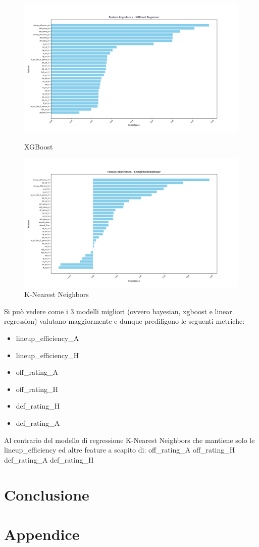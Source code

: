 \documentclass[a4paper]{article}
\numberwithin{equation}{section}
\begin{document}
\begin{figure}[H]
    \centering
    \begin{minipage}[b]{0.45\linewidth}
        \centering
        \includegraphics[width=\linewidth]{img/xgboost.png}
        \caption{XGBoost}
        \label{fig:first_label}
    \end{minipage}
    \hspace{0.05\linewidth}
    \begin{minipage}[b]{0.45\linewidth}
        \centering
        \includegraphics[width=\linewidth]{img/knn.png}
        \caption{K-Nearest Neighbors}
        \label{fig:second_label}
    \end{minipage}
\end{figure}

Si può vedere come i 3 modelli migliori (ovvero bayesian, xgboost e linear regression) valutano maggiormente e dunque prediligono le seguenti metriche:
\begin{itemize}
    \item lineup\_efficiency\_A
    \item lineup\_efficiency\_H
    \item off\_rating\_A
    \item off\_rating\_H
    \item def\_rating\_H
    \item def\_rating\_A
\end{itemize} 
Al contrario del modello di regressione K-Nearest Neighbors che mantiene solo le lineup\_efficiency ed altre feature a scapito di:
off\_rating\_A
off\_rating\_H
def\_rating\_A
def\_rating\_H




\section{Conclusione}


\section{Appendice}
\end{document}
